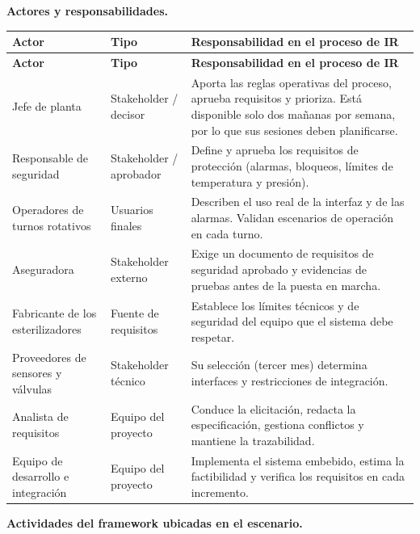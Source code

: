 \textbf{Actores y responsabilidades.}

{\small
\setlength{\tabcolsep}{4pt}
\renewcommand{\arraystretch}{1.3}
\begin{longtable}{
|>{\raggedright\arraybackslash}p{}
|>{\raggedright\arraybackslash}p{}
|>{\raggedright\arraybackslash}p{}|}
\hline
\textbf{Actor} & \textbf{Tipo} & \textbf{Responsabilidad en el proceso de IR} \\
\hline
\endfirsthead
\hline
\textbf{Actor} & \textbf{Tipo} & \textbf{Responsabilidad en el proceso de IR} \\
\hline
\endhead
Jefe de planta & Stakeholder / decisor & Aporta las reglas operativas del proceso, aprueba requisitos y prioriza. Está disponible solo dos mañanas por semana, por lo que sus sesiones deben planificarse. \\
\hline
Responsable de seguridad & Stakeholder / aprobador & Define y aprueba los requisitos de protección (alarmas, bloqueos, límites de temperatura y presión). \\
\hline
Operadores de turnos rotativos & Usuarios finales & Describen el uso real de la interfaz y de las alarmas. Validan escenarios de operación en cada turno. \\
\hline
Aseguradora & Stakeholder externo & Exige un documento de requisitos de seguridad aprobado y evidencias de pruebas antes de la puesta en marcha. \\
\hline
Fabricante de los esterilizadores & Fuente de requisitos & Establece los límites técnicos y de seguridad del equipo que el sistema debe respetar. \\
\hline
Proveedores de sensores y válvulas & Stakeholder técnico & Su selección (tercer mes) determina interfaces y restricciones de integración. \\
\hline
Analista de requisitos & Equipo del proyecto & Conduce la elicitación, redacta la especificación, gestiona conflictos y mantiene la trazabilidad. \\
\hline
Equipo de desarrollo e integración & Equipo del proyecto & Implementa el sistema embebido, estima la factibilidad y verifica los requisitos en cada incremento. \\
\hline
\end{longtable}
}

\textbf{Actividades del framework ubicadas en el escenario.}

